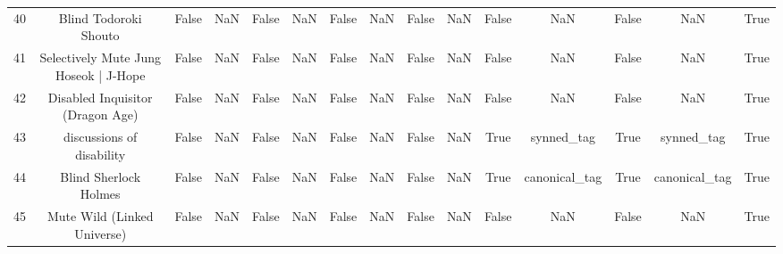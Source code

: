 \begin{table}[h!]
{\begin{tabular}{|c|c|c|c|c|c|c|c|c|c|c|c|c|c|c|}
         40 &                             Blind Todoroki Shouto &                          False &                       NaN &                          False &                       NaN &                          False &                       NaN &                          False &                       NaN &                          False &                       NaN &                          False &                       NaN &                           True \\
         41 &             Selectively Mute Jung Hoseok | J-Hope &                          False &                       NaN &                          False &                       NaN &                          False &                       NaN &                          False &                       NaN &                          False &                       NaN &                          False &                       NaN &                           True \\
         42 &                  Disabled Inquisitor (Dragon Age) &                          False &                       NaN &                          False &                       NaN &                          False &                       NaN &                          False &                       NaN &                          False &                       NaN &                          False &                       NaN &                           True \\
         43 &                         discussions of disability &                          False &                       NaN &                          False &                       NaN &                          False &                       NaN &                          False &                       NaN &                           True &                synned\_tag &                           True &                synned\_tag &                           True \\
         44 &                             Blind Sherlock Holmes &                          False &                       NaN &                          False &                       NaN &                          False &                       NaN &                          False &                       NaN &                           True &             canonical\_tag &                           True &             canonical\_tag &                           True \\
         45 &                       Mute Wild (Linked Universe) &                          False &                       NaN &                          False &                       NaN &                          False &                       NaN &                          False &                       NaN &                          False &                       NaN &                          False &                       NaN &                           True \\

\end{tabular}}
\end{table}
